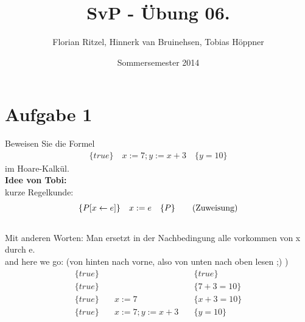 \documentclass[ngerman,a4paper]{report}
\author{Florian Ritzel, Hinnerk van Bruinehsen, Tobias Höppner}
\title{SvP - Übung 06. }
\date{Sommersemester 2014}
\renewcommand{\maketitle}{}
\begin{document}
\maketitle
\section*{Aufgabe 1}
Beweisen Sie die Formel
\begin{align*}
\{true\}\quad
x:=7;y:=x+3\quad
\{y=10\}
\end{align*}
im Hoare-Kalkül.\\
\textbf{Idee von Tobi:}\\
kurze Regelkunde:
\begin{align}
\{P[x\leftarrow e]	\}\quad	x:=e 	\quad						\{P\}\tag{Zuweisung}\\
\notag
\end{align}
Mit anderen Worten: Man ersetzt in der Nachbedingung alle vorkommen von x durch e.\\
and here we go: (von hinten nach vorne, also von unten nach oben lesen ;) )
\begin{align*}
\{true\}\quad & 			\quad &\{true\} \\
\{true\}\quad &			\quad &\{7+3=10\} \tag{Zuweisung}\\
\{true\}\quad &	x:=7		\quad &\{x+3=10\} \tag{Zuweisung}\\
\{true\}\quad &	x:=7;y:=x+3		\quad &\{y=10\}\\
\end{align*}

\end{document}
